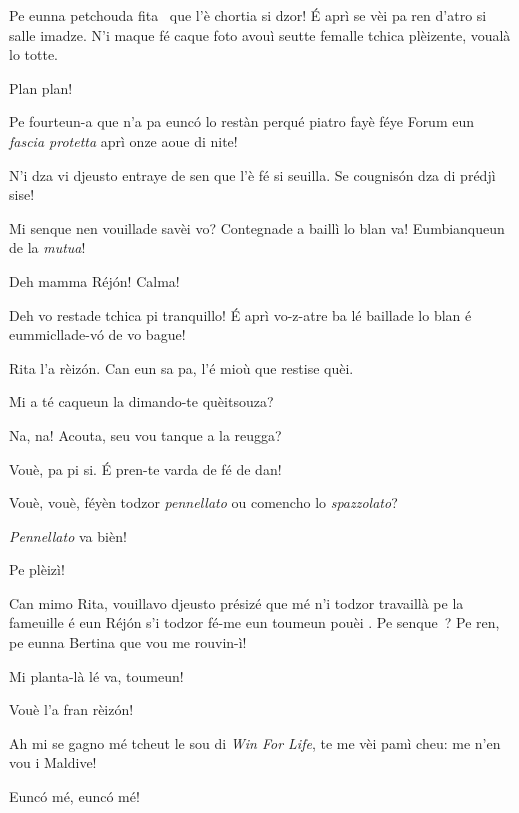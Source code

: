 \begin{drama}
\Tobiespeaks Pe eunna petchouda fita \fitaa\ que l’è chortia si dzor! É aprì se vèi pa ren d’atro si salle imadze. N’i maque fé caque foto avouì seutte femalle tchica plèizente, voualà lo totte.

\Pascalspeaks {} Plan plan!

\Bertinaspeaks Pe fourteun-a que n’a pa eunc\'o lo restàn perqué piatro fayè féye Forum eun \textit{fascia protetta} aprì onze aoue di nite!

\Eumprezeospeaks N’i dza vi djeusto entraye de sen que l’è fé si seuilla. Se cougnisón dza di prédjì sise!

\Tobiespeaks Mi senque nen vouillade savèi vo? Contegnade a baillì lo blan va! Eumbianqueun de la \textit{mutua}!

\Simonspeaks Deh mamma Réjón! Calma!

\Ritaspeaks {} Deh vo restade tchica pi tranquillo!  É aprì vo-z-atre ba lé baillade lo blan é eum\-mi\-clla\-de-vó de vo bague!

\Simonspeaks Rita l’a rèizón. Can eun sa pa, l’é mioù que restise quèi.

\Eumprezeospeaks Mi a té caqueun la dimando-te quèitsouza?

\Simonspeaks Na, na! Acouta, seu vou tanque a la reugga?

\Eumprezeospeaks Vouè, pa pi si. É pren-te varda de fé de dan!

\Simonspeaks Vouè, vouè, féyèn todzor \textit{pennellato} ou comencho lo \textit{spazzolato}?

\Eumprezeospeaks \textit{Pennellato} va bièn!

\Ritaspeaks {} Pe plèizì!

\Tobiespeaks Can mimo Rita, vouillavo djeusto présizé que mé n’i todzor travaillà pe la fameuille é eun Réjón s’i todzor fé-me eun toumeun pouèi . Pe senque\ \triste ? Pe ren, pe eunna Bertina que vou me rouvin-ì!

\Eumprezeospeaks Mi planta-là lé va, toumeun!

\Bertinaspeaks Vouè l’a fran rèizón!

\Tobiespeaks  {} Ah mi se gagno mé tcheut le sou di \textit{Win For Life}, te me vèi pamì cheu: me n'en vou i Maldive!

\Simonspeaks Eunc\'o mé, eunc\'o mé!


\end{drama}
